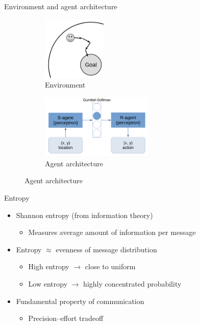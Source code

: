 \documentclass{beamer}
\begin{document}
\begin{frame}{Environment and agent architecture} \begin{center}
    \begin{figure}
        \begin{subfigure}{0.45\linewidth}
            \includegraphics[height=1.2in]{assets/navigation.pdf}
            \caption{Environment}
        \end{subfigure}
        \hfill
        \begin{subfigure}{0.45\linewidth}
            \includegraphics[height=1.2in]{assets/agent-architecture.pdf}
            \caption{Agent architecture}
        \end{subfigure}
    \end{figure}
    \end{center}
\end{frame}

\begin{frame}{Entropy}
    \begin{itemize}
        \item Shannon entropy (from information theory)
            \begin{itemize}
                \item Measures average amount of information per message
            \end{itemize}
        \item Entropy $\approx$ evenness of message distribution
            \begin{itemize}
                \item High entropy $\rightarrow$ close to uniform
                \item Low entropy $\rightarrow$ highly concentrated probability
            \end{itemize}
        \item Fundamental property of communication
            \begin{itemize}
                \item Precision--effort tradeoff
            \end{itemize}
    \end{itemize}
\end{frame}
\end{document}

